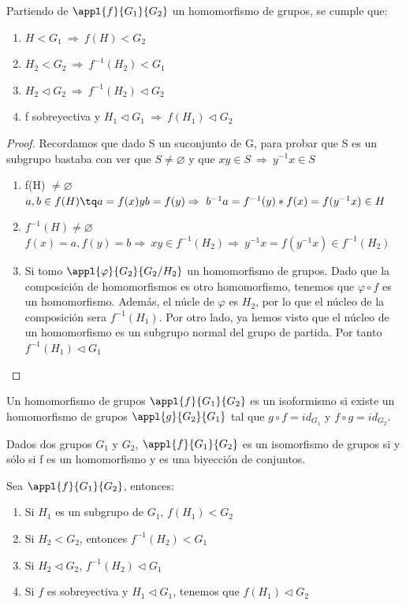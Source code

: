 \documentclass{apuntes}
\begin{document}
Partiendo de $\appl{f}{G_1}{G_2}$  un homomorfismo de grupos, se cumple que:
\begin{enumerate}
 \item $H<G_1 \ \Rightarrow \ f(H)<G_2$
 \item $H_2<G_2 \ \Rightarrow \ f^{-1}(H_2)<G_1$
 \item $H_2 \vartriangleleft G_2 \ \Rightarrow \ f^{-1}(H_2)\vartriangleleft G_2$
 \item f sobreyectiva y $H_1 \vartriangleleft G_1 \ \Rightarrow \ f(H_1)\vartriangleleft G_2$
\end{enumerate}
\begin{proof}
Recordamos que dado S un suconjunto de G, para probar que S es un subgrupo bastaba con ver que $S \neq \varnothing$  y que $xy\in S \ \Rightarrow \ y^{-1}x\in S $
 \begin{enumerate}
  \item f(H) $\neq \varnothing$\\
  $a,b\in f(H) \tq a=f(x) y b=f(y) \Rightarrow \ b^{-1}a=f^{-1}(y)*f(x)=f(y^{-1}x)\in H$
  \item $f^{-1}(H)\neq \varnothing$\\
  $f(x)=a, f(y)=b \Rightarrow \ xy\in f^{-1}(H_2) \Rightarrow \ y^{-1}x=f(y^{-1}x)\in f^{-1}(H_2)$
  \item Si tomo $\appl{\varphi}{G_2}{G_2/H_2}$  un homomorfismo de grupos. Dado que la composición de homomorfismos es otro homomorfismo, 
  tenemos que $\varphi \circ f$  es un homomorfismo. Además, el núcle de $\varphi$  es $H_2$, por lo que el núcleo de la composición sera $f^{-1}(H_1)$.
  Por otro lado, ya hemos visto que el núcleo de un homomorfismo es un subgrupo normal del grupo de partida. Por tanto $f^{-1}(H_1) \vartriangleleft G_1$
 \end{enumerate}
 \end{proof}

\begin{defn}[Isomorfismo]
Un homomorfismo de grupos $\appl{f}{G_1}{G_2}$ es un isoformismo si existe un homomorfismo de grupos $\appl{g}{G_2}{G_1}$ tal que $g\circ f = id_{G_1}$ y $f\circ g = id_{G_2}$. 
\end{defn}


\begin{remark} Dados dos grupos $G_1$ y $G_2$, $\appl{f}{G_1}{G_2}$ es un isomorfismo de grupos si y sólo si f es un homomorfismo y es una biyección de conjuntos.
\end{remark}

\begin{lemma}
Sea $\appl{f}{G_1}{G_2}$, entonces:
\begin{enumerate}
\item Si $H_1$ es un subgrupo de $G_1$, $f(H_1)<G_2$
\item Si $H_2 < G_2$, entonces $f^{-1}(H_2)<G_1$
\item Si $H_2 \lhd G_2$, $f^{-1}(H_2)\lhd G_1$
\item Si $f$ es sobreyectiva y $H_1\lhd G_1$, tenemos que $f(H_1)\lhd G_2$
\end{enumerate}
\end{lemma}
\end{document}
